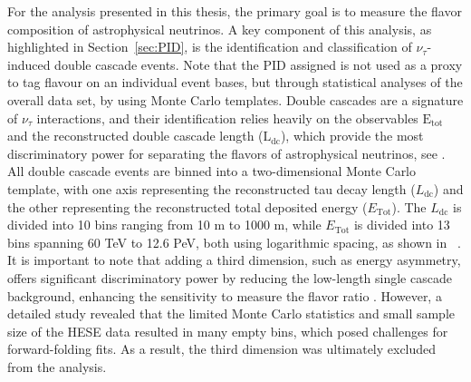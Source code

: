 For the analysis presented in this thesis, the primary goal is to measure the flavor composition of astrophysical neutrinos. A key component of this analysis, as highlighted in Section~\ref{sec:PID}, is the identification and classification of $\nu_\tau$-induced double cascade events. Note that the PID assigned is not used as a proxy to tag flavour on an individual event bases, but through statistical analyses of the overall data set, by using Monte Carlo templates. Double cascades are a signature of $\nu_\tau$ interactions, and their identification relies heavily on the observables $\mathrm{E}_\mathrm{tot}$ and the reconstructed double cascade length ($\mathrm{L}_{\text{dc}}$), which provide the most discriminatory power for separating the flavors of astrophysical neutrinos, see . All double cascade events are binned into a two-dimensional Monte Carlo template, with one axis representing the reconstructed tau decay length ($L_{\text{dc}}$) and the other representing the reconstructed total deposited energy ($E_{\text{Tot}}$). The $L_{\text{dc}}$ is divided into 10 bins ranging from 10 m to 1000 m, while $E_{\text{Tot}}$ is divided into 13 bins spanning 60 TeV to 12.6 PeV, both using logarithmic spacing, as shown in ~. It is important to note that adding a third dimension, such as energy asymmetry, offers significant discriminatory power by reducing the low-length single cascade background, enhancing the sensitivity to measure the flavor ratio . However, a detailed study revealed that the limited Monte Carlo statistics and small sample size of the HESE data resulted in many empty bins, which posed challenges for forward-folding fits. As a result, the third dimension was ultimately excluded from the analysis.


